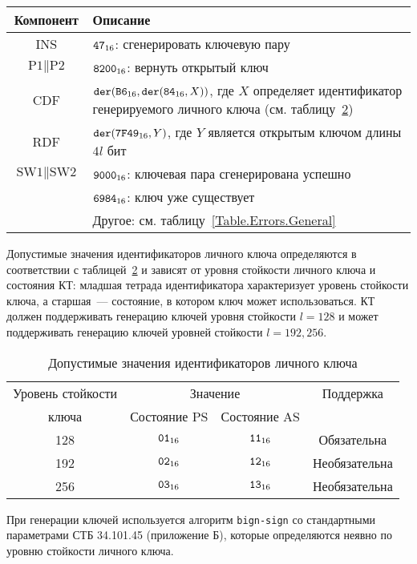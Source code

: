 \begin{table}[hbt]
\caption{}\label{Table.Oper.GenKeysCmd}
\begin{tabular}{|c|p{14cm}|}
\hline
Компонент & Описание\\
\hline
\hline
INS & $\texttt{47}_{16}$: сгенерировать ключевую пару \\
\hline
$\text{P1} \parallel\text{P2}$ & $\texttt{8200}_{16}$:
вернуть открытый ключ \\
\hline
CDF & $\texttt{der}(\texttt{B6}_{16},\texttt{der}(\texttt{84}_{16}, X))$,
где $X$ определяет идентификатор генерируемого личного ключа
(см. таблицу~\ref{Table.Oper.KeyRef}) \\
\hline 
RDF & $\texttt{der}(\texttt{7F49}_{16}, Y)$, где $Y$ является открытым ключом длины $4l$ бит\\
\hline
$\text{SW1} \parallel \text{SW2}$ & 
$\texttt{9000}_{16}$: ключевая пара сгенерирована успешно \\
\cline{2-2}
  & $\texttt{6984}_{16}$: ключ уже существует \\
\cline{2-2}
  & Другое: см. таблицу~\ref{Table.Errors.General} \\
\hline
\end{tabular}
\end{table}

Допустимые значения идентификаторов личного ключа определяются
в соответствии с таблицей~\ref{Table.Oper.KeyRef} и зависят от
уровня стойкости личного ключа и состояния КТ:
младшая тетрада идентификатора характеризует уровень стойкости ключа,
а старшая~--- состояние, в котором ключ может использоваться.
КТ должен поддерживать генерацию ключей уровня стойкости 
$l=128$ и может поддерживать генерацию ключей 
уровней стойкости $l=192,256$.

\begin{table}[hbt]
\caption{Допустимые значения идентификаторов личного ключа}
\label{Table.Oper.KeyRef}
\begin{tabular}{|c|c|c|c|}
\hline
Уровень стойкости & \multicolumn{2}{|c|}{Значение } & Поддержка\\
\cline{2-3}
ключа & Состояние PS & Состояние AS & \\
\hline
\hline
128 & $\texttt{01}_{16}$ & $\texttt{11}_{16}$ & Обязательна \\
192 & $\texttt{02}_{16}$ & $\texttt{12}_{16}$ & Необязательна\\
256 & $\texttt{03}_{16}$ & $\texttt{13}_{16}$ & Необязательна\\
\hline
\end{tabular}
\end{table}

При генерации ключей используется алгоритм \texttt{bign-sign}
со стандартными параметрами СТБ 34.101.45 (приложение Б), 
которые определяются неявно по уровню стойкости личного ключа. 

